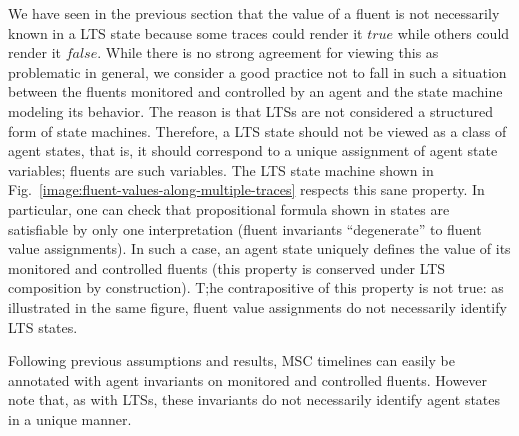 We have seen in the previous section that the value of a fluent is not necessarily known in a LTS state because some traces could render it $true$ while others could render it $false$. While there is no strong agreement for viewing this as problematic in general, we consider a good practice not to fall in such a situation between the fluents monitored and controlled by an agent and the state machine modeling its behavior. The reason is that LTSs are not considered a structured form of state machines. Therefore, a LTS state should not be viewed as a class of agent states, that is, it should correspond to a unique assignment of agent state variables; fluents are such variables. The LTS state machine shown in Fig.~\ref{image:fluent-values-along-multiple-traces} respects this sane property. In particular, one can check that propositional formula shown in states are satisfiable by only one interpretation (fluent invariants ``degenerate'' to fluent value assignments). In such a case, an agent state uniquely defines the value of its monitored and controlled fluents (this property is conserved under LTS composition by construction). T;he contrapositive of this property is not true: as illustrated in the same figure, fluent value assignments do not necessarily identify LTS states.

Following previous assumptions and results, MSC timelines can easily be annotated with agent invariants on monitored and controlled fluents. However note that, as with LTSs, these invariants do not necessarily identify agent states in a unique manner.
